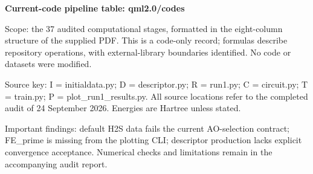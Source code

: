 \documentclass[10pt]{article}
\begin{document}
{\Large\bfseries Current-code pipeline table: qml2.0/codes}\par\vspace{3mm}
Scope: the 37 audited computational stages, formatted in the eight-column structure of the supplied PDF. This is a code-only record; formulas describe repository operations, with external-library boundaries identified. No code or datasets were modified.\par
Source key: I = initialdata.py; D = descriptor.py; R = run1.py; C = circuit.py; T = train.py; P = plot\_run1\_results.py. All source locations refer to the completed audit of 24 September 2026. Energies are Hartree unless stated.\par
Important findings: default H2S data fails the current AO-selection contract; FE\_prime is missing from the plotting CLI; descriptor production lacks explicit convergence acceptance. Numerical checks and limitations remain in the accompanying audit report.\par
\end{document}
